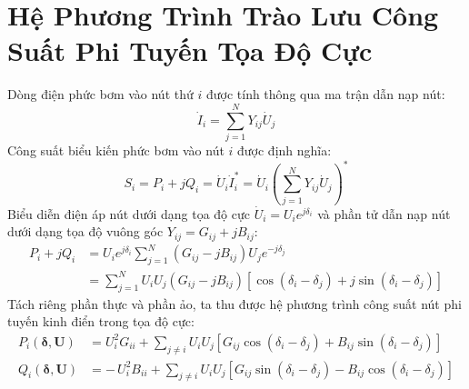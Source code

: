 \documentclass[12pt,a4paper,oneside]{report}
\begin{document}
\section{Hệ Phương Trình Trào Lưu Công Suất Phi Tuyến Tọa Độ Cực}
Dòng điện phức bơm vào nút thứ $i$ được tính thông qua ma trận dẫn nạp nút:
\begin{equation}
\dot{I}_i = \sum_{j=1}^N Y_{ij} \dot{U}_j
\end{equation}
Công suất biểu kiến phức bơm vào nút $i$ được định nghĩa:
\begin{equation}
S_i = P_i + jQ_i = \dot{U}_i \dot{I}_i^* = \dot{U}_i \left( \sum_{j=1}^N Y_{ij} \dot{U}_j \right)^*
\end{equation}
Biểu diễn điện áp nút dưới dạng tọa độ cực $\dot{U}_i = U_i e^{j\delta_i}$ và phần tử dẫn nạp nút dưới dạng tọa độ vuông góc $Y_{ij} = G_{ij} + jB_{ij}$:
\begin{align}
P_i + jQ_i &= U_i e^{j\delta_i} \sum_{j=1}^N (G_{ij} - jB_{ij}) U_j e^{-j\delta_j} \\
&= \sum_{j=1}^N U_i U_j (G_{ij} - jB_{ij}) \left[ \cos(\delta_i - \delta_j) + j \sin(\delta_i - \delta_j) \right]
\end{align}
Tách riêng phần thực và phần ảo, ta thu được hệ phương trình công suất nút phi tuyến kinh điển trong tọa độ cực:
\begin{align}
P_i(\boldsymbol{\delta}, \mathbf{U}) &= U_i^2 G_{ii} + \sum_{j \ne i} U_i U_j \left[ G_{ij} \cos(\delta_i - \delta_j) + B_{ij} \sin(\delta_i - \delta_j) \right] \label{eq:p_polar} \\
Q_i(\boldsymbol{\delta}, \mathbf{U}) &= -\, U_i^2 B_{ii} + \sum_{j \ne i} U_i U_j \left[ G_{ij} \sin(\delta_i - \delta_j) - B_{ij} \cos(\delta_i - \delta_j) \right] \label{eq:q_polar}
\end{align}
\end{document}
